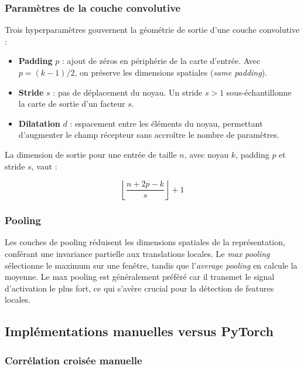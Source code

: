 \documentclass[11pt,a4paper]{article}
\begin{document}
\subsubsection{Paramètres de la couche convolutive}

Trois hyperparamètres gouvernent la géométrie de sortie d'une couche convolutive :

\begin{itemize}
  \item \textbf{Padding} $p$ : ajout de zéros en périphérie de la carte d'entrée.
        Avec $p = (k-1)/2$, on préserve les dimensions spatiales (\textit{same padding}).
  \item \textbf{Stride} $s$ : pas de déplacement du noyau. Un stride $s > 1$ sous-échantillonne
        la carte de sortie d'un facteur $s$.
  \item \textbf{Dilatation} $d$ : espacement entre les éléments du noyau, permettant
        d'augmenter le champ récepteur sans accroître le nombre de paramètres.
\end{itemize}

La dimension de sortie pour une entrée de taille $n$, avec noyau $k$, padding $p$ et
stride $s$, vaut :

\begin{equation}
  \left\lfloor \frac{n + 2p - k}{s} \right\rfloor + 1
  \label{eq:conv_output_size}
\end{equation}

\subsubsection{Pooling}

Les couches de pooling réduisent les dimensions spatiales de la représentation,
conférant une invariance partielle aux translations locales. Le \textit{max pooling}
sélectionne le maximum sur une fenêtre, tandis que l'\textit{average pooling} en
calcule la moyenne. Le max pooling est généralement préféré car il transmet le signal
d'activation le plus fort, ce qui s'avère crucial pour la détection de features locales.

\subsection{Implémentations manuelles versus PyTorch}

\subsubsection{Corrélation croisée manuelle}
\end{document}
